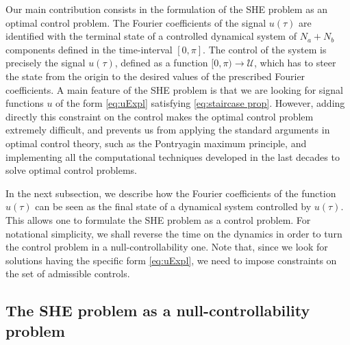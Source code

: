 \documentclass[twocolumn]{autart}    %
\begin{document}
Our main contribution consists in the formulation of the SHE problem as an optimal control problem.
The Fourier coefficients of the signal $u(\tau)$ are identified with the terminal state of a controlled dynamical system of $N_a+N_b$ components defined in the time-interval $[0,\pi]$.  The control of the system is precisely the signal $u(\tau)$, defined as a function $[0,\pi)\to \mathcal{U}$, which has to steer the state from the origin to the desired values of the prescribed Fourier coefficients.
A main feature of the SHE problem is that we are looking for signal functions $u$ of the form \eqref{eq:uExpl} satisfying \eqref{eq:staircase prop}.
However, adding directly this constraint on the control makes the optimal control problem extremely difficult, and prevents us from applying the standard arguments in optimal control theory, such as the Pontryagin maximum principle, and implementing all the computational techniques developed in the last decades to solve optimal control problems.


In the next subsection, we describe how the Fourier coefficients of the function $u(\tau)$ can be seen as the final state of a dynamical system controlled by $u (\tau)$.
This allows one to formulate the SHE problem as a control problem.
For notational simplicity, we shall reverse the time on the dynamics in order to turn the control problem in a null-controllability one.
Note that, since we look for solutions having the specific form \eqref{eq:uExpl}, we need to impose constraints on the set of admissible controls.




\subsection{The SHE problem as  a null-controllability problem}
\end{document}
